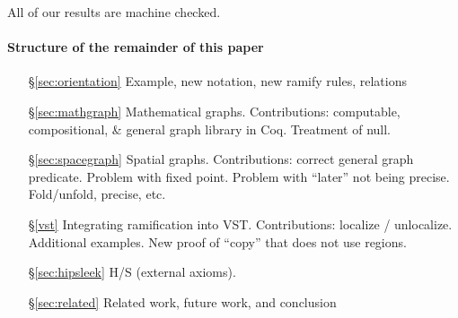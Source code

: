 All of our results are machine checked. %

{\color{magenta}\paragraph{Structure of the remainder of this paper}
\begin{itemize}
\item[\S\ref{sec:orientation}] Example, new notation, new ramify rules, relations
\item[\S\ref{sec:mathgraph}] Mathematical graphs.  Contributions: computable, compositional, \& general graph library in Coq.  Treatment of null.
\item[\S\ref{sec:spacegraph}] Spatial graphs.  Contributions: correct general graph predicate.  Problem with fixed point.  Problem with ``later'' not being precise.  Fold/unfold, precise, etc.
\item[\S\ref{vst}] Integrating ramification into VST.  Contributions: localize / unlocalize.  Additional examples.  New proof of ``copy'' that does not use regions.
\item[\S\ref{sec:hipsleek}] H/S (external axioms).
\item[\S\ref{sec:related}] Related work, future work, and conclusion
\end{itemize}
}